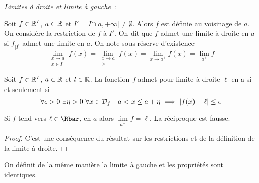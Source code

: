 \emph{Limites à droite et limite à gauche}~:

Soit $f \in \mathbb{R}^I$, $a\in \mathbb{R}$ et $I'=I \cap ]a, +\infty[ \neq \emptyset$. Alors $f$ est définie au voisinage de $a$. On considére la restriction de $f$ à $I'$. On dit que $f$ admet une limite à droite en $a$ si $f_{|I^{'}}$ admet une limite en $a$. On note sous réserve d'existence
\begin{equation}
  \lim\limits_{\begin{array}{l} x \to a \\ x \in I\end{array}}f(x)=\lim\limits_{\begin{array}{c} x \to a \\ >\end{array}}f(x)=\lim\limits_{x \to a^{+}}f(x)=\lim\limits_{a^{+}}f
\end{equation}
\begin{defdef}
  Soit $f \in \mathbb{R}^I$, $a\in \mathbb{R}$ et $l \in \mathbb{R}$. La fonction $f$ admet pour limite à droite $\ell$ en a si et seulement si
  \begin{equation}
    \forall \epsilon > 0 \ \exists \eta > 0 \ \forall x \in \mathcal{D}_{f} \quad a<x\leq a+\eta \implies \left\lvert f(x)-\ell\right\rvert \leq \epsilon
  \end{equation}
\end{defdef}

\begin{prop}
  Si $f$ tend vers $\ell \in \Rbar$, en $a$ alors $\lim\limits_{a^{+}}f=\ell$. La réciproque est fausse.
\end{prop}
\begin{proof}
  C'est une conséquence du résultat sur les restrictions et de la définition de la limite à droite.
\end{proof}

On définit de la même manière la limite à gauche et les propriétés sont identiques.

